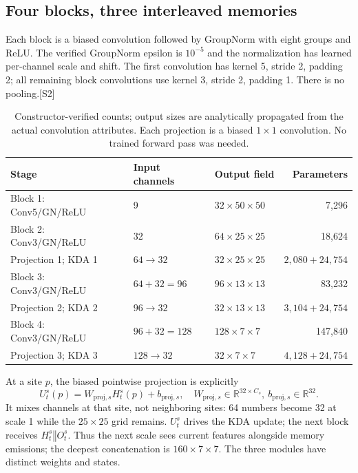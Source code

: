 \documentclass[10pt,letterpaper]{article}
\newcommand{\R}{\mathbb{R}}
\newcommand{\cat}{\mathbin\Vert}
\newcommand{\src}[1]{\textcolor{accent}{\textsf{[#1]}}}
\begin{document}
\subsection{Four blocks, three interleaved memories}
Each block is a biased convolution followed by GroupNorm with eight groups and ReLU. The verified GroupNorm epsilon is $10^{-5}$ and the normalization has learned per-channel scale and shift. The first convolution has kernel 5, stride 2, padding 2; all remaining block convolutions use kernel 3, stride 2, padding 1. There is no pooling.\src{S2}\par
\begin{table}[h!]
\centering\small
\begin{tabular}{@{}lllr@{}}\toprule
Stage & Input channels & Output field & Parameters\\\midrule
Block 1: Conv5/GN/ReLU & 9 & $32\times50\times50$ & 7,296\\
Block 2: Conv3/GN/ReLU & 32 & $64\times25\times25$ & 18,624\\
Projection 1; KDA 1 & $64\to32$ & $32\times25\times25$ & $2,080+24,754$\\
Block 3: Conv3/GN/ReLU & $64+32=96$ & $96\times13\times13$ & 83,232\\
Projection 2; KDA 2 & $96\to32$ & $32\times13\times13$ & $3,104+24,754$\\
Block 4: Conv3/GN/ReLU & $96+32=128$ & $128\times7\times7$ & 147,840\\
Projection 3; KDA 3 & $128\to32$ & $32\times7\times7$ & $4,128+24,754$\\\bottomrule
\end{tabular}
\caption{Constructor-verified counts; output sizes are analytically propagated from the actual convolution attributes. Each projection is a biased $1\times1$ convolution. No trained forward pass was needed.}
\end{table}
At a site $p$, the biased pointwise projection is explicitly
\begin{equation}
U_t^s(p)=W_{\mathrm{proj},s}H_t^s(p)+b_{\mathrm{proj},s},\quad
W_{\mathrm{proj},s}\in\R^{32\times C_s},\ b_{\mathrm{proj},s}\in\R^{32}.
\end{equation}
It mixes channels at that site, not neighboring sites: 64 numbers become 32 at scale 1 while the $25\times25$ grid remains. $U_t^s$ drives the KDA update; the next block receives $H_t^s\cat O_t^s$. Thus the next scale sees current features alongside memory emissions; the deepest concatenation is $160\times7\times7$. The three modules have distinct weights and states.
\end{document}
